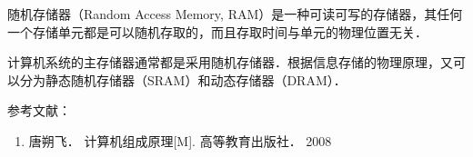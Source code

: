
随机存储器（Random Access Memory, RAM）是一种可读可写的存储器，其任何一个存储单元都是可以随机存取的，而且存取时间与单元的物理位置无关．

计算机系统的主存储器通常都是采用随机存储器．根据信息存储的物理原理，又可以分为静态随机存储器（SRAM）和动态存储器（DRAM）．


参考文献：
\begin{enumerate}
\item 唐朔飞． 计算机组成原理[M]. 高等教育出版社． 2008
\end{enumerate}